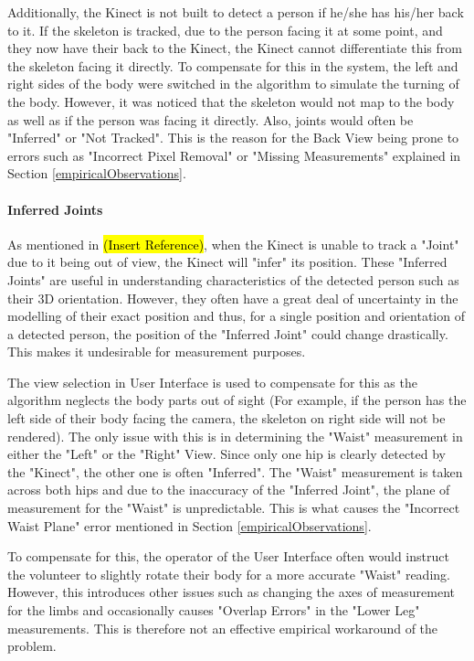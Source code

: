 Additionally, the Kinect is not built to detect a person if he/she has his/her back to it. If the skeleton is tracked, due to the person facing it at some point, and they now have their back to the Kinect, the Kinect cannot differentiate this from the skeleton facing it directly. To compensate for this in the system, the left and right sides of the body were switched in the algorithm to simulate the turning of the body. However, it was noticed that the skeleton would not map to the body as well as if the person was facing it directly. Also, joints would often be "Inferred" or "Not Tracked". This is the reason for the Back View being prone to errors such as "Incorrect Pixel Removal" or "Missing Measurements" explained in Section \ref{empiricalObservations}. 

\paragraph{Inferred Joints}
As mentioned in \hl{(Insert Reference)}, when the Kinect is unable to track a "Joint" due to it being out of view, the Kinect will "infer" its position. These "Inferred Joints" are useful in understanding characteristics of the detected person such as their 3D orientation. However, they often have a great deal of uncertainty in the modelling of their exact position and thus, for a single position and orientation of a detected person, the position of the "Inferred Joint" could change drastically. This makes it undesirable for measurement purposes.

The view selection in User Interface is used to compensate for this as the algorithm neglects the body parts out of sight (For example, if the person has the left side of their body facing the camera, the skeleton on right side will not be rendered). The only issue with this is in determining the "Waist" measurement in either the "Left" or the "Right" View. Since only one hip is clearly detected by the "Kinect", the other one is often "Inferred". The "Waist" measurement is taken across both hips and due to the inaccuracy of the "Inferred Joint", the plane of measurement for the "Waist" is unpredictable. This is what causes the "Incorrect Waist Plane" error mentioned in Section \ref{empiricalObservations}. 

To compensate for this, the operator of the User Interface often would instruct the volunteer to slightly rotate their body for a more accurate "Waist" reading. However, this introduces other issues such as changing the axes of measurement for the limbs and occasionally causes "Overlap Errors" in the "Lower Leg" measurements. This is therefore not an effective empirical workaround of the problem. 

